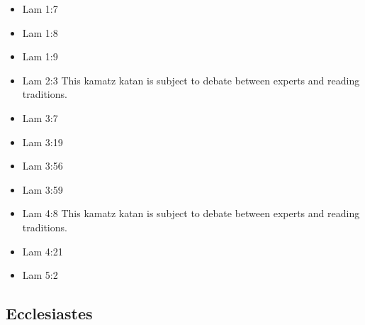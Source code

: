 \documentclass[14pt]{article}
\begin{document}
\begin{multicols}{2}\begin{itemize}
	
	\item Lam 1:7
	
	\item Lam 1:8
	
	\item Lam 1:9
	
	\item Lam 2:3 This kamatz katan is subject to debate between experts and reading traditions.
			
			\item Lam 3:7
			
			\item Lam 3:19
			
			\item Lam 3:56
			
			\item Lam 3:59
			
			\item Lam 4:8 This kamatz katan is subject to debate between experts and reading traditions.
			
			\item Lam 4:21
			
			\item Lam 5:2
			
		\end{itemize}\end{multicols}
	
\subsection{Ecclesiastes}
\end{document}
